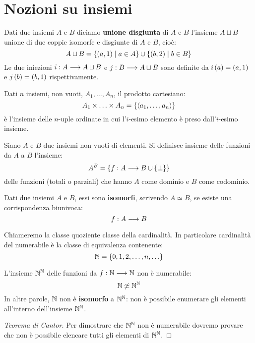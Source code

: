 \documentclass{lectures}
\begin{document}
\section{Nozioni su insiemi}
\begin{multicols}{2}
\begin{definition}
Dati due insiemi \(A\) e \(B\) diciamo \textbf{unione disgiunta} di \(A\) e \(B\) l'insieme \(A \sqcup B\) unione di due coppie isomorfe e disgiunte di \(A\) e \(B\), cioè:
\[
    A \sqcup B = \left\{\left(a,1\right) \mid a \in A\right\} \cup \left\{\left(b,2\right)\mid b \in B\right\}
\]
Le due iniezioni \(i:A\longrightarrow A \sqcup B\) e \(j:B\longrightarrow A \sqcup B\) sono definite da \(i\left(a\right) = \left(a,1\right)\) e \(j\left(b\right) = \left(b,1\right)\) rispettivamente.
\end{definition}
\begin{definition}
    Dati \(n\) insiemi, non vuoti, \(A_1, \ldots, A_n\), il prodotto cartesiano:
    \[
        A_1 \times \ldots \times A_n = \left\{\left\langle a_1, \ldots, a_n\right\rangle\right\}
    \]
    è l'insieme delle \(n\)-uple ordinate in cui l'\(i\)-esimo elemento è preso dall'\(i\)-esimo insieme.
\end{definition}
\begin{definition}
    Siano \(A\) e \(B\) due insiemi non vuoti di elementi. Si definisce insieme delle funzioni da \(A\) a \(B\) l'insieme:
    \[
        A^B = \left\{f:A\longrightarrow B \cup \left\{\bot\right\}\right\}
    \]
    delle funzioni (totali o parziali) che hanno \(A\) come dominio e \(B\) come codominio.
\end{definition}
\begin{definition}
    Dati due insiemi \(A\) e \(B\), essi sono \textbf{isomorfi}, scrivendo \(A \simeq B\), se esiste una corrispondenza biunivoca:
    \[
        f:A\longrightarrow B
    \]
\end{definition}
\begin{definition}[Cardinalità]
    Chiameremo la classe quoziente classe della cardinalità. In particolare cardinalità del numerabile è la classe di equivalenza contenente:
    \[
        \mathbb{N} = \left\{0,1,2,\ldots, n, \ldots\right\}
    \]
\end{definition}
\begin{theorem}
    L'insieme \(\mathbb{N}^{\mathbb{N}}\) delle funzioni da \(f:\mathbb{N}\longrightarrow \mathbb{N}\) non è numerabile:
    \[
        \mathbb{N} \not\simeq \mathbb{N}^{\mathbb{N}}
    \]
    In altre parole, \(\mathbb{N}\) non è \textbf{isomorfo} a \(\mathbb{N}^{\mathbb{N}}\): non è possibile enumerare gli elementi all'interno dell'insieme \(\mathbb{N}^{\mathbb{N}}\).
\end{theorem}
\begin{proof}[Teorema di Cantor]
    Per dimostrare che \(\mathbb{N}^{\mathbb{N}}\) non è numerabile dovremo provare che non è possibile elencare tutti gli elementi di \(\mathbb{N}^{\mathbb{N}}\).
    

\end{proof}
\end{multicols}
\end{document}
